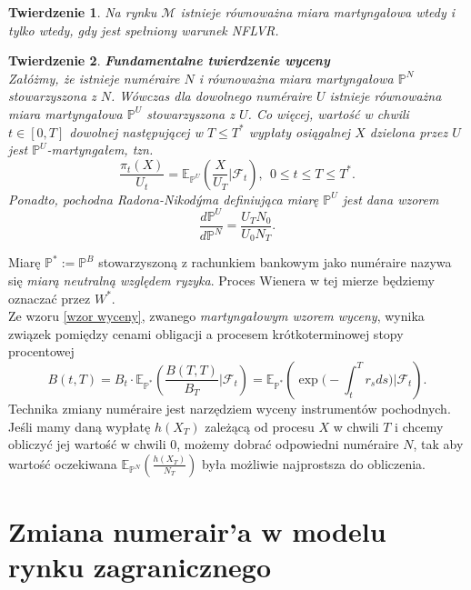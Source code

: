 \documentclass{mini}
\theoremstyle{mythstyle}
\newtheorem{Twierdzenie}{Twierdzenie}[chapter]
\begin{document}
\begin{Twierdzenie}
	Na rynku $\mathcal{M}$ istnieje równoważna miara martyngałowa wtedy
	i tylko wtedy, gdy jest spełniony warunek NFLVR.\\
\end{Twierdzenie}
\begin{Twierdzenie}\textbf{Fundamentalne twierdzenie wyceny}\\
	Załóżmy, że istnieje num\'{e}raire $N$ i równoważna miara
	martyngałowa $\mathbb{P}^N$ stowarzyszona z $N$. Wówczas dla
	dowolnego num\'{e}raire $U$ istnieje równoważna miara martyngałowa
	$\mathbb{P}^U$ stowarzyszona z $U$. Co więcej, wartość w chwili
	$t\in [0,T]$ dowolnej następującej w $T \leq T^*$ wypłaty osiągalnej $X$
	dzielona przez $U$ jest $\mathbb{P}^U$-martyngałem, tzn.
	\begin{equation} \label{wzor wyceny}
	\frac{\pi_t(X)}{U_t}=\mathbb{E}_{\mathbb{P}^U}
	\left(\frac{X}{U_T} \bigg| \mathcal{F}_t\right), \ \ 0\leq t \leq T \leq T^*.
	\end{equation}
	Ponadto, pochodna Radona-Nikod\'{y}ma definiująca miarę $\mathbb{P}^U$
	jest dana wzorem
	\begin{equation} \label{Radon-Nikodym}
	\frac{d\mathbb{P}^U}{d\mathbb{P}^N}=\frac{U_T N_0}{U_0 N_T}.
	\end{equation}
\end{Twierdzenie}
Miarę $\mathbb{P}^* := \mathbb{P}^B$ stowarzyszoną z rachunkiem
bankowym jako num\'{e}raire nazywa się \textit{miarą neutralną względem
	ryzyka}. Proces Wienera w tej mierze będziemy oznaczać przez $W^*$.\\ \indent
Ze wzoru \eqref{wzor wyceny}, zwanego \emph{martyngałowym wzorem wyceny}, wynika związek pomiędzy cenami obligacji a procesem krótkoterminowej stopy procentowej
\begin{equation*}
 B(t,T)=B_t \cdot \mathbb{E}_{\mathbb{P}^*}
 \left(\frac{B(T,T)}{B_T} \bigg| \mathcal{F}_t\right)=\mathbb{E}_{\mathbb{P}^*}
 \left(\exp\bigg(-\int_t^T r_sds\bigg) \bigg|\mathcal{F}_t\right).
\end{equation*}
Technika zmiany num\'{e}raire jest narzędziem wyceny instrumentów pochodnych. Jeśli mamy daną wypłatę $h(X_T)$ zależącą od procesu $X$ w chwili $T$ i chcemy obliczyć jej wartość w chwili 0, możemy dobrać odpowiedni num\'{e}raire $N$, tak aby wartość oczekiwana $\mathbb{E}_{\mathbb{P}^N} \left(\frac{h(X_T)}{N_T}\right)$ była możliwie najprostsza do obliczenia. 

\section{Zmiana numerair'a w modelu rynku zagranicznego}
\end{document}
